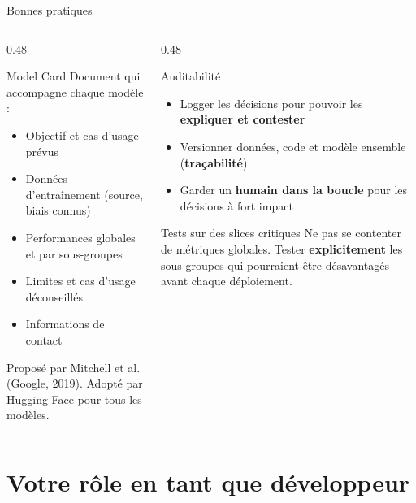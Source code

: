 \documentclass[aspectratio=169, 10pt]{beamer}
\begin{document}
\begin{frame}{Bonnes pratiques}
  \begin{columns}[T]
    \begin{column}{0.48\textwidth}
      \begin{exampleblock}{Model Card}
        Document qui accompagne chaque modèle :
        \begin{itemize}
          \item Objectif et cas d'usage prévus
          \item Données d'entraînement (source, biais connus)
          \item Performances globales et par sous-groupes
          \item Limites et cas d'usage déconseillés
          \item Informations de contact
        \end{itemize}
        \vspace{2pt}
        \small Proposé par Mitchell et al. (Google, 2019).
        Adopté par Hugging Face pour tous les modèles.
      \end{exampleblock}
    \end{column}
    \begin{column}{0.48\textwidth}
      \begin{block}{Auditabilité}
        \begin{itemize}
          \item Logger les décisions pour pouvoir
                les \textbf{expliquer et contester}
          \item Versionner données, code et modèle
                ensemble (\textbf{traçabilité})
          \item Garder un \textbf{humain dans la boucle}
                pour les décisions à fort impact
        \end{itemize}
      \end{block}
      \smallskip
      \begin{block}{Tests sur des slices critiques}
        Ne pas se contenter de métriques globales.
        Tester \textbf{explicitement} les sous-groupes
        qui pourraient être désavantagés
        avant chaque déploiement.
      \end{block}
    \end{column}
  \end{columns}
\end{frame}

\section{Votre rôle en tant que développeur}
\end{document}
